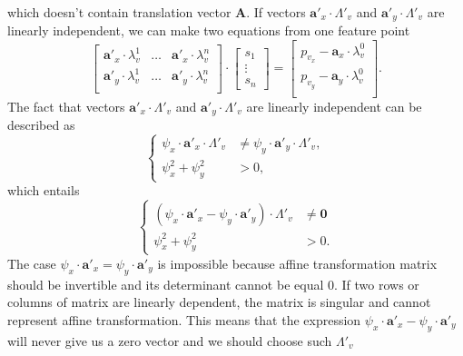 which doesn't contain translation vector $\pmb{A}$.
If vectors $\pmb{a}'_x \cdot \Lambda'_v$ and $\pmb{a}'_y \cdot \Lambda'_v$
are linearly independent,
we can make two equations from one feature point
\begin{equation*}
  \begin{bmatrix}
    \pmb{a}'_x \cdot \lambda^1_v & \dots & \pmb{a}'_x \cdot \lambda^n_v \\
    \pmb{a}'_y \cdot \lambda^1_v & \dots & \pmb{a}'_y \cdot \lambda^n_v \\
  \end{bmatrix}
  \cdot \begin{bmatrix}
    s_1 \\
    \vdots \\
    s_n
  \end{bmatrix}
  = \begin{bmatrix}
    p_{v_x} - \pmb{a}_x \cdot \lambda^0_v \\
    p_{v_y} - \pmb{a}_y \cdot \lambda^0_v \\
  \end{bmatrix}.
\end{equation*}
The fact that vectors $\pmb{a}'_x \cdot \Lambda'_v$ and $\pmb{a}'_y \cdot \Lambda'_v$
are linearly independent can be described as
\begin{equation*}
  \left\{\begin{aligned}
    \psi_x \cdot \pmb{a}'_x \cdot \Lambda'_v
      &\neq \psi_y \cdot \pmb{a}'_y \cdot \Lambda'_v, \\
    \psi_x^2 + \psi_y^2 &> 0,
  \end{aligned}\right.
\end{equation*}
which entails
\begin{equation*}
  \left\{\begin{aligned}
    \left( \psi_x \cdot \pmb{a}'_x - \psi_y \cdot \pmb{a}'_y \right) \cdot \Lambda'_v
      &\neq \pmb{0} \\
    \psi_x^2 + \psi_y^2 &> 0.
  \end{aligned}\right.
\end{equation*}
The case $\psi_x \cdot \pmb{a}'_x = \psi_y \cdot \pmb{a}'_y$ is impossible
because affine transformation matrix should be invertible
and its determinant cannot be equal $0$.
If two rows or columns of matrix are linearly dependent,
the matrix is singular and cannot represent affine transformation.
This means that the expression $\psi_x \cdot \pmb{a}'_x - \psi_y \cdot \pmb{a}'_y$
will never give us a zero vector and we should choose such $\Lambda'_v$
